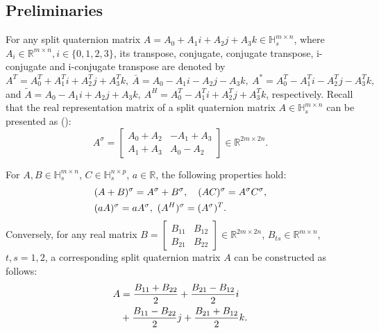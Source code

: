 \documentclass{book}
\theoremstyle{remark}
\begin{document}
\begin{multicols}{2}
\section{Preliminaries}
For any split quaternion matrix ${A}=A_{0}+A_{1}i + A_{2}j + A_{3}k \in\mathbb{H}_{s}^{m\times n}$, where $A_{i}\in\mathbb{R}^{m\times n}, i\in\{0,1,2,3\}$, its transpose, conjugate, conjugate transpose, i-conjugate and i-conjugate transpose are  denoted by 
 ${A}^T = A_0^T + A_1^Ti + A_2^Tj + A_3^Tk, \ \bar{{A}} = A_0 - A_1i - A_2j - A_3k, \ {A}^* = A_0^T - A_1^Ti - A_2^Tj - A_3^Tk,$ and
 $\tilde{A} = A_0 - A_1i + A_2j + A_3k, \ {A}^H = A_0^T - A_1^Ti + A_2^Tj + A_3^Tk$, respectively. Recall that the real representation matrix of a split quaternion matrix $A \in\mathbb{H}_{s}^{m\times n}$ can be presented as (\cite{TJiang2018, Gang2024}):
\begin{equation}\label{eq:2.1}
A^\sigma = \begin{bmatrix} A_0 + A_2 & -A_1 + A_3 \\ A_1 + A_3 & A_0 - A_2 \end{bmatrix} \in \mathbb{R}^{2m \times 2n}.
\end{equation}

For $A, B \in \mathbb{H}_s^{m \times n}$, $C \in \mathbb{H}_s^{n \times p}$, $a \in \mathbb{R}$, the following properties hold:
\begin{align}\label{eq:2.2}
     &(A + B)^\sigma = A^\sigma + B^\sigma, \quad (AC)^\sigma = A^\sigma C^\sigma,  \notag \\
     &(a A)^\sigma = a A^\sigma, \ (A^H)^\sigma = (A^\sigma)^T.
\end{align}
Conversely, for any real matrix $B = \begin{bmatrix} B_{11} & B_{12} \\ B_{21} & B_{22} \end{bmatrix} \in \mathbb{R}^{2m \times 2n}$, $B_{ts} \in \mathbb{R}^{m \times n}$, $t, s = 1, 2$, a corresponding split quaternion matrix $A$ can be constructed as follows:
\begin{align}\label{eq:2.3}
{A} &= \frac{B_{11} + B_{22}}{2} + \frac{B_{21} - B_{12}}{2}i \notag  \\
&+ \frac{B_{11} - B_{22}}{2}j + \frac{B_{21} + B_{12}}{2}k.
\end{align}


\end{multicols}
\end{document}
